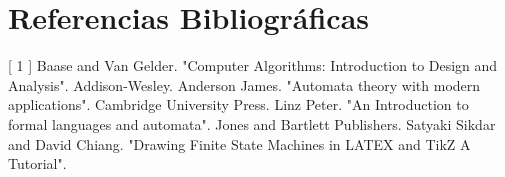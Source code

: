 \section{Referencias Bibliográficas}

[ 1 ] Baase and Van Gelder. "Computer Algorithms: Introduction to Design and Analysis". Addison-Wesley. \hfill \break \break
[ 2 ] Anderson James. "Automata theory with modern applications". Cambridge University Press. \hfill \break \break
[ 3 ] Linz Peter. "An Introduction to formal languages and automata". Jones and Bartlett Publishers. \hfill \break \break
[ 4 ] Satyaki Sikdar and David Chiang. "Drawing Finite State Machines in LATEX and TikZ A Tutorial".